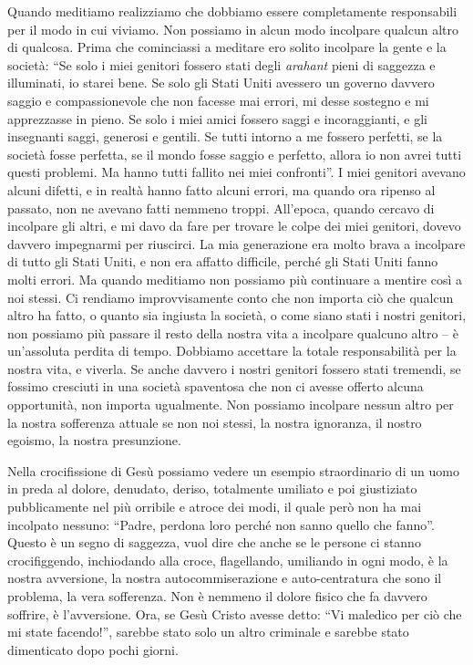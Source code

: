 Quando meditiamo realizziamo che dobbiamo essere completamente
responsabili per il modo in cui viviamo. Non possiamo in alcun modo
incolpare qualcun altro di qualcosa. Prima che cominciassi a meditare
ero solito incolpare la gente e la società: ``Se solo i miei genitori
fossero stati degli \emph{arahant} pieni di saggezza e illuminati, io
starei bene. Se solo gli Stati Uniti avessero un governo davvero saggio
e compassionevole che non facesse mai errori, mi desse sostegno e mi
apprezzasse in pieno. Se solo i miei amici fossero saggi e
incoraggianti, e gli insegnanti saggi, generosi e gentili. Se tutti
intorno a me fossero perfetti, se la società fosse perfetta, se il mondo
fosse saggio e perfetto, allora io non avrei tutti questi problemi. Ma
hanno tutti fallito nei miei confronti''. I miei genitori avevano alcuni
difetti, e in realtà hanno fatto alcuni errori, ma quando ora ripenso al
passato, non ne avevano fatti nemmeno troppi. All'epoca, quando cercavo
di incolpare gli altri, e mi davo da fare per trovare le colpe dei miei
genitori, dovevo davvero impegnarmi per riuscirci. La mia generazione
era molto brava a incolpare di tutto gli Stati Uniti, e non era affatto
difficile, perché gli Stati Uniti fanno molti errori. Ma quando
meditiamo non possiamo più continuare a mentire così a noi stessi. Ci
rendiamo improvvisamente conto che non importa ciò che qualcun altro ha
fatto, o quanto sia ingiusta la società, o come siano stati i nostri
genitori, non possiamo più passare il resto della nostra vita a
incolpare qualcuno altro -- è un'assoluta perdita di tempo. Dobbiamo
accettare la totale responsabilità per la nostra vita, e viverla. Se
anche davvero i nostri genitori fossero stati tremendi, se fossimo
cresciuti in una società spaventosa che non ci avesse offerto alcuna
opportunità, non importa ugualmente. Non possiamo incolpare nessun altro
per la nostra sofferenza attuale se non noi stessi, la nostra ignoranza,
il nostro egoismo, la nostra presunzione.

Nella crocifissione di Gesù possiamo vedere un esempio straordinario di
un uomo in preda al dolore, denudato, deriso, totalmente umiliato e poi
giustiziato pubblicamente nel più orribile e atroce dei modi, il quale
però non ha mai incolpato nessuno: ``Padre, perdona loro perché non
sanno quello che fanno''. Questo è un segno di saggezza, vuol dire che
anche se le persone ci stanno crocifiggendo, inchiodando alla croce,
flagellando, umiliand\protect\hypertarget{_GoBack3}{}{}o in ogni modo, è
la nostra avversione, la nostra autocommiserazione e auto-centratura che
sono il problema, la vera sofferenza. Non è nemmeno il dolore fisico che
fa davvero soffrire, è l'avversione. Ora, se Gesù Cristo avesse detto:
``Vi maledico per ciò che mi state facendo!'', sarebbe stato solo un
altro criminale e sarebbe stato dimenticato dopo pochi giorni.


